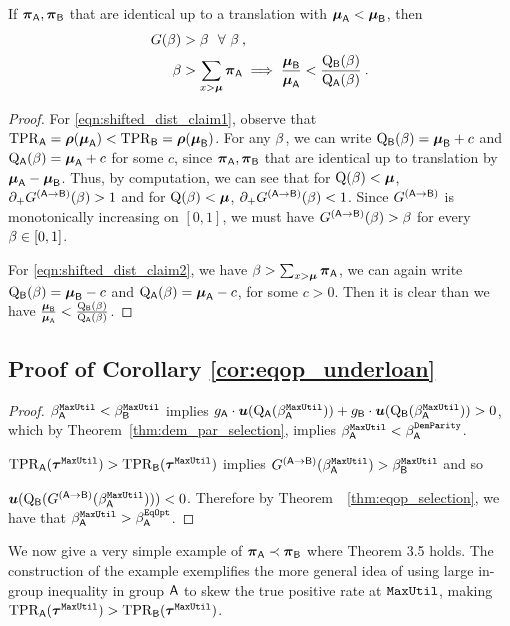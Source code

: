 	\begin{lem}\label{lem:geometry_shifted_dist}
		If $\boldsymbol{\pi}_{\mathsf{A}}, \boldsymbol{\pi}_{\mathsf{B}}$ that are identical up to a translation with $\boldsymbol{\mu}_{\mathsf{A}} < \boldsymbol{\mu}_{\mathsf{B}}$, then 
		\begin{align}
		G(\beta)&> \beta ~~\forall~ \beta\:, \label{eqn:shifted_dist_claim1}\\
		\beta &> \sum_{x > \boldsymbol{\mu} } \boldsymbol{\pi}_{\mathsf{A}} \implies \frac{\boldsymbol{\mu}_{\mathsf{B}}}{\boldsymbol{\mu}_{\mathsf{A}}} < \frac{\mathrm{Q}_{\mathsf{B}}(\beta)}{\mathrm{Q}_{\mathsf{A}}(\beta)} \:.\label{eqn:shifted_dist_claim2}
		\end{align}
		\begin{proof}
			For \eqref{eqn:shifted_dist_claim1}, observe that $\mathrm{TPR}_{\mathsf{A}} = \boldsymbol{\rho}(\boldsymbol{\mu}_{\mathsf{A}}) < \mathrm{TPR}_{\mathsf{B}} = \boldsymbol{\rho}(\boldsymbol{\mu}_{\mathsf{B}})$. For any $\beta$, we can write $\mathrm{Q}_{\mathsf{B}}(\beta) = \boldsymbol{\mu}_{\mathsf{B}} + c$ and $\mathrm{Q}_{\mathsf{A}}(\beta) = \boldsymbol{\mu}_{\mathsf{A}} + c$ for some $c$, since $\boldsymbol{\pi}_{\mathsf{A}}, \boldsymbol{\pi}_{\mathsf{B}}$ that are identical up to translation by $\boldsymbol{\mu}_{\mathsf{A}} -\boldsymbol{\mu}_{\mathsf{B}}$. Thus, by computation, we can see that for $\mathrm{Q}(\beta) < \boldsymbol{\mu}$, $\partial_+G^{(\mathsf{A}\to\mathsf{B})}(\beta) > 1$ and for $\mathrm{Q}(\beta) < \boldsymbol{\mu}$, $\partial_+G^{(\mathsf{A}\to\mathsf{B})}(\beta) < 1$. Since $G^{(\mathsf{A}\to\mathsf{B})}$ is monotonically increasing on $[0,1]$, we must have $G^{(\mathsf{A}\to\mathsf{B})}(\beta) > \beta$ for every $\beta \in[0,1]$.
			
			For \eqref{eqn:shifted_dist_claim2}, we have $\beta> \sum_{x > \boldsymbol{\mu} } \boldsymbol{\pi}_{\mathsf{A}}$, we can again write $\mathrm{Q}_{\mathsf{B}}(\beta) = \boldsymbol{\mu}_{\mathsf{B}} - c$ and $\mathrm{Q}_{\mathsf{A}}(\beta) = \boldsymbol{\mu}_{\mathsf{A}} - c$, for some $c > 0$. Then it is clear than we have $\frac{\boldsymbol{\mu}_{\mathsf{B}}}{\boldsymbol{\mu}_{\mathsf{A}}} < \frac{\mathrm{Q}_{\mathsf{B}}(\beta)}{\mathrm{Q}_{\mathsf{A}}(\beta)} $.
		\end{proof}
		
	\end{lem}
		
\subsection{Proof of Corollary \ref{cor:eqop_underloan}}
	\begin{proof}
		$\beta^{\mathtt{MaxUtil}}_{\mathsf{A}} < \beta^{\mathtt{MaxUtil}}_{\mathsf{B}}$ implies $g_{\mathsf{A}} \cdot  \boldsymbol{u}(\mathrm{Q}_{\mathsf{A}}(\beta^{\mathtt{MaxUtil}}_{\mathsf{A}})) + g_{\mathsf{B}} \cdot \boldsymbol{u}(\mathrm{Q}_{\mathsf{B}}(\beta^{\mathtt{MaxUtil}}_{\mathsf{A}})) > 0$, which by Theorem~\ref{thm:dem_par_selection}, implies $\beta_{\mathsf{A}}^{\mathtt{MaxUtil}} < \beta_{\mathsf{A}}^{\mathtt{DemParity}}$.
		
		$\mathrm{TPR}_{\mathsf{A}}(\boldsymbol{\tau}^{\mathtt{MaxUtil}}) > \mathrm{TPR}_{\mathsf{B}}(\boldsymbol{\tau}^{\mathtt{MaxUtil}})$ implies	$G^{(\mathsf{A}\to\mathsf{B})}(\beta^{\mathtt{MaxUtil}}_{\mathsf{A}}) >\beta^{\mathtt{MaxUtil}}_{\mathsf{B}}$ and so
		
		 $\boldsymbol{u}(\mathrm{Q}_{\mathsf{B}}(G^{(\mathsf{A}\to\mathsf{B})}(\beta^{\mathtt{MaxUtil}}_{\mathsf{A}})))<0$. %
		 Therefore by Theorem~~\ref{thm:eqop_selection}, we have that $\beta^{\mathtt{MaxUtil}}_{\mathsf{A}} > \beta^{\mathtt{EqOpt}}_{\mathsf{A}}$.
	\end{proof}
	We now give a very simple example of $\boldsymbol{\pi}_{\mathsf{A}}\prec \boldsymbol{\pi}_{\mathsf{B}}$ where Theorem 3.5 holds. The construction of the example exemplifies the more general idea of using large in-group inequality in group $\mathsf{A}$ to skew the true positive rate at $\mathtt{MaxUtil}$, making $\mathrm{TPR}_{\mathsf{A}}(\boldsymbol{\tau}^{\mathtt{MaxUtil}}) > \mathrm{TPR}_{\mathsf{B}}(\boldsymbol{\tau}^{\mathtt{MaxUtil}})$.
	
